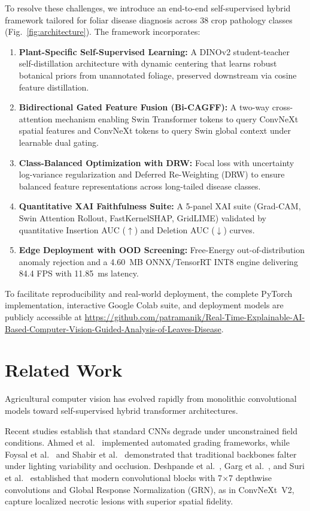 \documentclass[runningheads]{llncs}
\begin{document}
To resolve these challenges, we introduce an end-to-end self-supervised hybrid framework tailored for foliar disease diagnosis across 38 crop pathology classes (Fig.~\ref{fig:architecture}). The framework incorporates:
\begin{enumerate}
    \item \textbf{Plant-Specific Self-Supervised Learning:} A DINOv2 student-teacher self-distillation architecture with dynamic centering that learns robust botanical priors from unannotated foliage, preserved downstream via cosine feature distillation.
    \item \textbf{Bidirectional Gated Feature Fusion (Bi-CAGFF):} A two-way cross-attention mechanism enabling Swin Transformer tokens to query ConvNeXt spatial features and ConvNeXt tokens to query Swin global context under learnable dual gating.
    \item \textbf{Class-Balanced Optimization with DRW:} Focal loss with uncertainty log-variance regularization and Deferred Re-Weighting (DRW) to ensure balanced feature representations across long-tailed disease classes.
    \item \textbf{Quantitative XAI Faithfulness Suite:} A 5-panel XAI suite (Grad-CAM, Swin Attention Rollout, FastKernelSHAP, GridLIME) validated by quantitative Insertion AUC ($\uparrow$) and Deletion AUC ($\downarrow$) curves.
    \item \textbf{Edge Deployment with OOD Screening:} Free-Energy out-of-distribution anomaly rejection and a 4.60~MB ONNX/TensorRT INT8 engine delivering 84.4 FPS with 11.85~ms latency.
\end{enumerate}

To facilitate reproducibility and real-world deployment, the complete PyTorch implementation, interactive Google Colab suite, and deployment models are publicly accessible at \url{https://github.com/patramanik/Real-Time-Explainable-AI-Based-Computer-Vision-Guided-Analysis-of-Leaves-Disease}.

\section{Related Work}
Agricultural computer vision has evolved rapidly from monolithic convolutional models toward self-supervised hybrid transformer architectures.

Recent studies establish that standard CNNs degrade under unconstrained field conditions. Ahmed et al.~\cite{ref_ahmed2024} implemented automated grading frameworks, while Foysal et al.~\cite{ref_foysal2024} and Shabir et al.~\cite{ref_shabir2024} demonstrated that traditional backbones falter under lighting variability and occlusion. Deshpande et al.~\cite{ref_deshpande2024}, Garg et al.~\cite{ref_garg2026}, and Suri et al.~\cite{ref_suri2025} established that modern convolutional blocks with 7$\times$7 depthwise convolutions and Global Response Normalization (GRN), as in ConvNeXt~V2, capture localized necrotic lesions with superior spatial fidelity.
\end{document}
